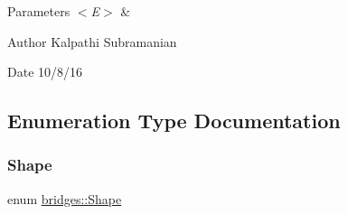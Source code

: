 \begin{DoxyParams}{Parameters}
{\em $<$\+E$>$} & \\
\hline
\end{DoxyParams}
\begin{DoxyAuthor}{Author}
Kalpathi Subramanian 
\end{DoxyAuthor}
\begin{DoxyDate}{Date}
10/8/16 
\end{DoxyDate}


\subsection{Enumeration Type Documentation}
\mbox{\label{namespacebridges_a1b4050586bd708782ae0d4f3b06b9579}} 
\subsubsection{\texorpdfstring{Shape}{Shape}}
{\footnotesize\ttfamily enum \mbox{\hyperlink{namespacebridges_a1b4050586bd708782ae0d4f3b06b9579}{bridges\+::\+Shape}}}

